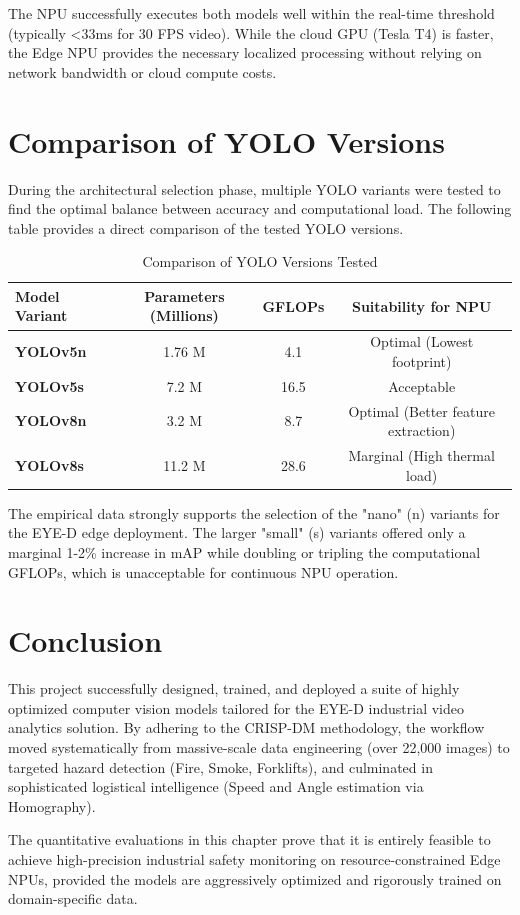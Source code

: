 The NPU successfully executes both models well within the real-time threshold (typically <33ms for 30 FPS video). While the cloud GPU (Tesla T4) is faster, the Edge NPU provides the necessary localized processing without relying on network bandwidth or cloud compute costs.

\section{Comparison of YOLO Versions}
During the architectural selection phase, multiple YOLO variants were tested to find the optimal balance between accuracy and computational load. The following table provides a direct comparison of the tested YOLO versions.

\begin{table}[h]
\centering
\caption{Comparison of YOLO Versions Tested}
\label{tab:yolo-comparison}
\renewcommand{\arraystretch}{1.2}
\begin{tabular}{|l|c|c|c|}
\hline
\textbf{Model Variant} & \textbf{Parameters (Millions)} & \textbf{GFLOPs} & \textbf{Suitability for NPU} \\
\hline
\textbf{YOLOv5n} & 1.76 M & 4.1 & Optimal (Lowest footprint) \\
\hline
\textbf{YOLOv5s} & 7.2 M & 16.5 & Acceptable \\
\hline
\textbf{YOLOv8n} & 3.2 M & 8.7 & Optimal (Better feature extraction) \\
\hline
\textbf{YOLOv8s} & 11.2 M & 28.6 & Marginal (High thermal load) \\
\hline
\end{tabular}
\end{table}

The empirical data strongly supports the selection of the "nano" (n) variants for the EYE-D edge deployment. The larger "small" (s) variants offered only a marginal 1-2\% increase in mAP while doubling or tripling the computational GFLOPs, which is unacceptable for continuous NPU operation.

\section{Conclusion}
This project successfully designed, trained, and deployed a suite of highly optimized computer vision models tailored for the EYE-D industrial video analytics solution. By adhering to the CRISP-DM methodology, the workflow moved systematically from massive-scale data engineering (over 22,000 images) to targeted hazard detection (Fire, Smoke, Forklifts), and culminated in sophisticated logistical intelligence (Speed and Angle estimation via Homography). 

The quantitative evaluations in this chapter prove that it is entirely feasible to achieve high-precision industrial safety monitoring on resource-constrained Edge NPUs, provided the models are aggressively optimized and rigorously trained on domain-specific data.

